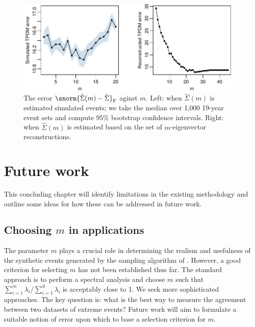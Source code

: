 \documentclass[en-GB, a4paper, nobind]{templates/bathreport}
\begin{document}
\begin{figure}

{\centering \includegraphics[width=1\linewidth]{figures/fr-tpdm-m-trend-1} 

}

\caption[Discrepancy between observed and simulated/reconstructed TPDMs against $m$.]{The error $\snorm{\hat{\Sigma}(m)-\hat{\Sigma}}_\mathrm{F}$ aginst $m$. Left: when $\hat{\Sigma}(m)$ is estimated simulated events; we take the median over 1,000 19-year event sets and compute $95\%$ bootstrap confidence intervals. Right: when $\hat{\Sigma}(m)$ is estimated based on the set of $m$-eigenvector reconstructions.}\label{fig:fr-tpdm-m-trend}
\end{figure}

\hypertarget{future-work}{%
\chapter{Future work}\label{future-work}}

\minitoc

\noindent This concluding chapter will identify limitations in the existing methodology and outline some ideas for how these can be addressed in future work.

\hypertarget{choosing-m-in-applications}{%
\section{\texorpdfstring{Choosing \(m\) in applications}{Choosing m in applications}}\label{choosing-m-in-applications}}

The parameter \(m\) plays a crucial role in determining the realism and usefulness of the synthetic events generated by the sampling algorithm of \textcite{rohrbeckSimulatingFloodEvent2021}. However, a good criterion for selecting \(m\) has not been established thus far. The standard approach is to perform a spectral analysis and choose \(m\) such that \(\sum_{i=1}^m \lambda_i/\sum_{i=1}^d \lambda_i\) is acceptably close to 1. We seek more sophisticated approaches. The key question is: what is the best way to measure the agreement between two datasets of extreme events? Future work will aim to formulate a suitable notion of error upon which to base a selection criterion for \(m\).
\end{document}
